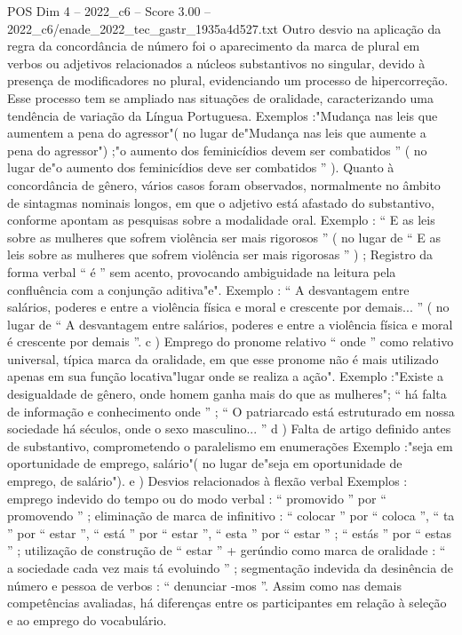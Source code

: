 \begin{textsample}{POS Dim 4 – 2022\_c6 – Score 3.00 – 2022\_c6/enade\_2022\_tec\_gastr\_1935a4d527.txt}
Outro desvio na aplicação da regra da concordância de número foi o aparecimento da marca de plural em verbos ou adjetivos relacionados a núcleos substantivos no singular, devido à presença de modificadores no plural, evidenciando um processo de hipercorreção.
Esse processo tem se ampliado nas situações de oralidade, caracterizando uma tendência de variação da Língua Portuguesa.
Exemplos :"Mudança nas leis que aumentem a pena do agressor"( no lugar de"Mudança nas leis que aumente a pena do agressor") ;"o aumento dos feminicídios devem ser combatidos ” ( no lugar de"o aumento dos feminicídios deve ser combatidos ” ).
Quanto à concordância de gênero, vários casos foram observados, normalmente no âmbito de sintagmas nominais longos, em que o adjetivo está afastado do substantivo, conforme apontam as pesquisas sobre a modalidade oral.
Exemplo : “ E as leis sobre as mulheres que sofrem violência ser mais rigorosos ” ( no lugar de “ E as leis sobre as mulheres que sofrem violência ser mais rigorosas ” ) ; Registro da forma verbal “ é ” sem acento, provocando ambiguidade na leitura pela confluência com a conjunção aditiva"e".
Exemplo : “ A desvantagem entre salários, poderes e entre a violência física e moral e crescente por demais... ” ( no lugar de “ A desvantagem entre salários, poderes e entre a violência física e moral é crescente por demais ”. c ) Emprego do pronome relativo “ onde ” como relativo universal, típica marca da oralidade, em que esse pronome não é mais utilizado apenas em sua função locativa"lugar onde se realiza a ação".
Exemplo :"Existe a desigualdade de gênero, onde homem ganha mais do que as mulheres"; “ há falta de informação e conhecimento onde ” ; “ O patriarcado está estruturado em nossa sociedade há séculos, onde o sexo masculino... ” d ) Falta de artigo definido antes de substantivo, comprometendo o paralelismo em enumerações Exemplo :"seja em oportunidade de emprego, salário"( no lugar de"seja em oportunidade de emprego, de salário"). e ) Desvios relacionados à flexão verbal Exemplos : emprego indevido do tempo ou do modo verbal : “ promovido ” por “ promovendo ” ; eliminação de marca de infinitivo : “ colocar ” por “ coloca ”, “ ta ” por “ estar ”, “ está ” por “ estar ”, “ esta ” por “ estar ” ; “ estás ” por “ estas ” ; utilização de construção de “ estar ” + gerúndio como marca de oralidade : “ a sociedade cada vez mais tá evoluindo ” ; segmentação indevida da desinência de número e pessoa de verbos : “ denunciar -mos ”.
Assim como nas demais competências avaliadas, há diferenças entre os participantes em relação à seleção e ao emprego do vocabulário.

\end{textsample}
